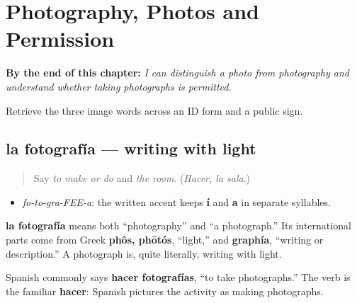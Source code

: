 
\chapter{Photography, Photos and Permission}
\label{ch:fotografia-foto-permitir}

\begin{chapteropening}
\textbf{By the end of this chapter:} \emph{I can distinguish a photo from photography and understand whether taking photographs is permitted.}

Retrieve the three image words across an ID form and a public sign.
\end{chapteropening}

\section[la fotografía]{la fotografía — writing with light}

\label{lesson:ES-C405-fotografia}



\begin{quote}
Say \emph{to make or do} and \emph{the room}. (\emph{Hacer, la sala}.)
\end{quote}

\begin{sounds}
\begin{itemize}
\raggedright
  \item \emph{fo-to-gra-FEE-a}: the written accent keeps \textbf{í} and \textbf{a} in separate syllables.
\end{itemize}
\end{sounds}

\begin{cousinweb}
\textbf{la fotografía} means both “photography” and “a photograph.” Its international parts come from Greek \textbf{phôs, phōtós}, “light,” and \textbf{graphía}, “writing or description.” A photograph is, quite literally, writing with light.

Spanish commonly says \textbf{hacer fotografías}, “to take photographs.” The verb is the familiar \textbf{hacer}: Spanish pictures the activity as making photographs.
\end{cousinweb}

